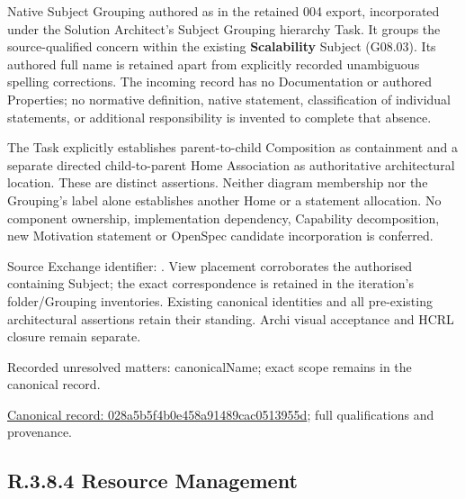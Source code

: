 Native Subject Grouping authored as \texttt{} in the retained 004 export,
incorporated under the Solution Architect's Subject Grouping hierarchy Task.
It groups the source-qualified \texttt{} concern within
the existing \textbf{Scalability} Subject (G08.03). Its authored full name
is retained apart from explicitly recorded unambiguous spelling corrections.
The incoming record has no Documentation or authored Properties; no normative
definition, native statement, classification of individual statements, or
additional responsibility is invented to complete that absence.



The Task explicitly establishes parent-to-child Composition as containment and
a separate directed child-to-parent Home Association as authoritative architectural
location. These are distinct assertions. Neither diagram membership nor the
Grouping's label alone establishes another Home or a statement allocation.
No component ownership, implementation dependency, Capability decomposition,
new Motivation statement or OpenSpec candidate incorporation is conferred.



Source Exchange identifier: \texttt{}. View placement corroborates
the authorised containing Subject; the exact correspondence is retained in the
iteration's folder/Grouping inventories. Existing canonical identities and all
pre-existing architectural assertions retain their standing. Archi visual
acceptance and HCRL closure remain separate.


{\small Recorded unresolved matters: canonicalName; exact scope remains in the canonical record.}\par
{\footnotesize \href{../../../../continuum/grouping/028a5b5f4b0e458a91489cac0513955d.md}{Canonical record: 028a5b5f4b0e458a91489cac0513955d}; full qualifications and provenance.}\par
\subsection*{R.3.8.4 Resource Management}
\label{navigation:R.3.8.4}

